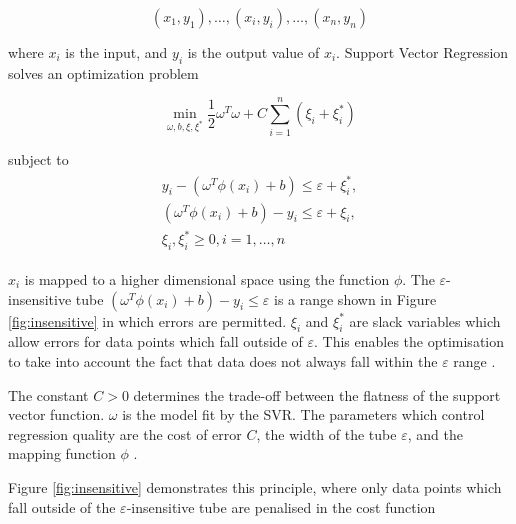 \begin{equation}
(x_1,y_1), \ldots,(x_i,y_i),\ldots,(x_n,y_n) 
\end{equation}

\noindent where $x_i$ is the input, and $y_i$ is the output value of $x_i$. Support Vector Regression solves an optimization problem \cite{Shu2006,Chen2004}

\begin{equation}
\min_{\omega,b,\xi,\xi^{*}}\frac{1}{2}\omega^T\omega+C\sum_{i=1}^{n}(\xi_i+\xi_i^*)
\end{equation}

\noindent subject to
\begin{align}
\begin{multlined}
\label{svr:constrains}
y_i-(\omega^T\phi(x_i)+b)\leq\varepsilon+\xi_i^{*},\\
(\omega^T\phi(x_i)+b)-y_i\leq\varepsilon+\xi_i,\\
\xi_i,\xi^*_i\geq0,i=1,\ldots,n
\end{multlined}
\end{align}


\noindent $x_i$ is mapped to a higher dimensional space using the function $\phi$. The $\varepsilon$-insensitive tube $(\omega^T\phi(x_i)+b)-y_i\leq\varepsilon$ is a range shown in Figure \ref{fig:insensitive} in which errors are permitted. $\xi_i$ and $\xi^*_i$ are slack variables which allow errors for data points which fall outside of $\varepsilon$. This enables the optimisation to take into account the fact that data does not always fall within the $\varepsilon$ range \cite{Smola2004}.

The constant $C>0$ determines the trade-off between the flatness of the support vector function. $\omega$ is the model fit by the SVR. The parameters which control regression quality are the cost of error $C$, the width of the tube $\varepsilon$, and the mapping function $\phi$ \cite{Shu2006,Chen2004}. 

Figure \ref{fig:insensitive} demonstrates this principle, where only data points which fall outside of the $\varepsilon$-insensitive tube are penalised in the cost function

